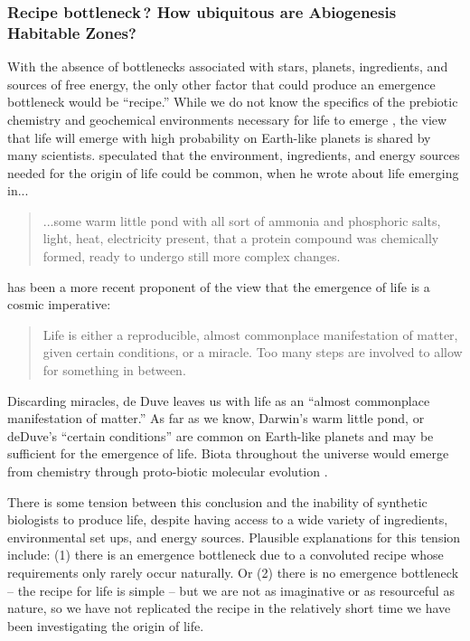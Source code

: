 \subsubsection{Recipe bottleneck\,? How ubiquitous are Abiogenesis Habitable Zones?}
\label{sec:recipe}

With the absence of bottlenecks associated with stars, planets, ingredients, and sources of free energy, the only other factor that could produce an
emergence bottleneck would be ``recipe.'' While we do not know the specifics of the prebiotic chemistry and geochemical environments necessary for life to emerge \citep[\eg,][]{Orgel1998,Stueken2013}, the view that life will emerge with high probability on Earth-like planets is shared by many scientists.
\citet{Darwin1871} speculated that the environment, ingredients, and energy sources needed for the origin of life could be common, when he wrote about life emerging in...

\begin{quotation}
	...some warm little pond with all sort of ammonia and phosphoric salts, light, heat, electricity present, that a protein compound was chemically formed, ready to undergo
	still more complex changes.
\end{quotation}
\citet{DeDuve1995} has been a more recent proponent of the view that the emergence of life is a cosmic imperative:
\begin{quotation}
	Life is either a reproducible, almost commonplace manifestation of matter, given certain conditions, or a miracle. Too many steps are involved to allow for something in between.
\end{quotation}
Discarding miracles, de Duve leaves us with life as an ``almost commonplace manifestation of matter.''
As far as we know, Darwin's warm little pond, or deDuve's ``certain conditions'' are common on Earth-like planets and may be sufficient for the emergence of life.
Biota throughout the universe would emerge from chemistry through proto-biotic molecular evolution \citep[\eg,][]{Eigen1992,Eschenmoser1996,Orgel1998,Ward2000,Martin2007,Russell2013}.

There is some tension between this conclusion and  the inability of synthetic biologists to produce life, despite having access to a wide variety of ingredients, environmental set ups, and energy sources.
Plausible explanations for this tension include:
(1) there is an emergence bottleneck due to a convoluted recipe whose requirements only rarely occur naturally.
Or (2) there is no emergence bottleneck -- the recipe for life is simple -- but we are not as imaginative or as resourceful as nature, so we have not replicated the recipe in the relatively short time we have been investigating the origin of life.

